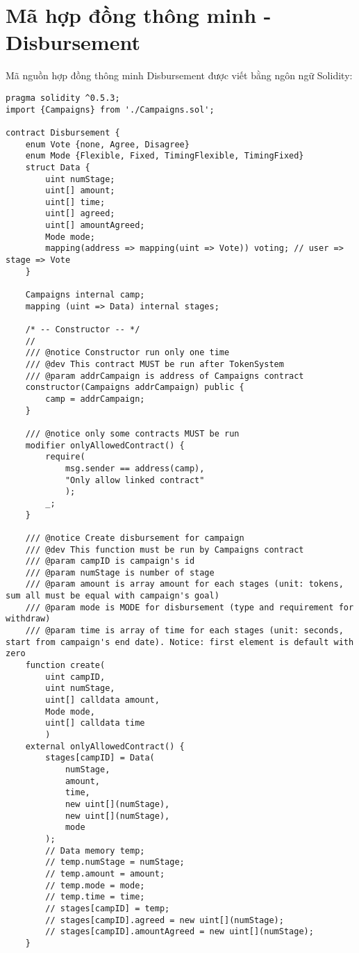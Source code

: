 \documentclass[../main-report.tex]{subfiles}
\begin{document}
\chapter{Mã hợp đồng thông minh - Disbursement}
Mã nguồn hợp đồng thông minh Disbursement được viết bằng ngôn ngữ Solidity:

\begin{lstlisting}
pragma solidity ^0.5.3;
import {Campaigns} from './Campaigns.sol';

contract Disbursement {
    enum Vote {none, Agree, Disagree}
    enum Mode {Flexible, Fixed, TimingFlexible, TimingFixed}
    struct Data {
        uint numStage;
        uint[] amount;
        uint[] time;
        uint[] agreed;
        uint[] amountAgreed;
        Mode mode;
        mapping(address => mapping(uint => Vote)) voting; // user => stage => Vote
    }

    Campaigns internal camp;
    mapping (uint => Data) internal stages;

    /* -- Constructor -- */
    //
    /// @notice Constructor run only one time
    /// @dev This contract MUST be run after TokenSystem
    /// @param addrCampaign is address of Campaigns contract
    constructor(Campaigns addrCampaign) public {
        camp = addrCampaign;
    }

    /// @notice only some contracts MUST be run
    modifier onlyAllowedContract() {
        require(
            msg.sender == address(camp),
            "Only allow linked contract"
            );
        _;
    }

    /// @notice Create disbursement for campaign
    /// @dev This function must be run by Campaigns contract
    /// @param campID is campaign's id
    /// @param numStage is number of stage
    /// @param amount is array amount for each stages (unit: tokens, sum all must be equal with campaign's goal)
    /// @param mode is MODE for disbursement (type and requirement for withdraw)
    /// @param time is array of time for each stages (unit: seconds, start from campaign's end date). Notice: first element is default with zero
    function create(
        uint campID,
        uint numStage,
        uint[] calldata amount,
        Mode mode,
        uint[] calldata time
        )
    external onlyAllowedContract() {
        stages[campID] = Data(
            numStage,
            amount,
            time,
            new uint[](numStage),
            new uint[](numStage),
            mode
        );
        // Data memory temp;
        // temp.numStage = numStage;
        // temp.amount = amount;
        // temp.mode = mode;
        // temp.time = time;
        // stages[campID] = temp;
        // stages[campID].agreed = new uint[](numStage);
        // stages[campID].amountAgreed = new uint[](numStage);
    }


\end{lstlisting}
\end{document}

